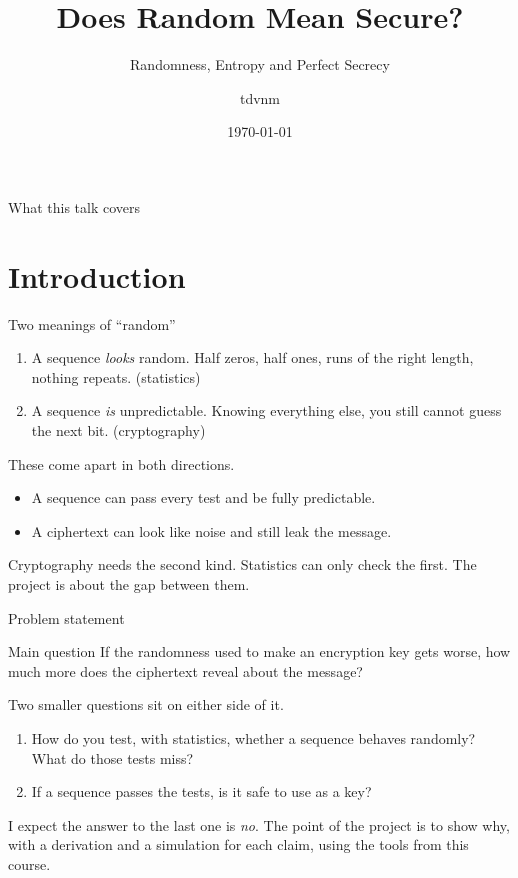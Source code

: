 \documentclass[10pt,aspectratio=169]{beamer}
\title{Does Random Mean Secure?}
\subtitle{Randomness, Entropy and Perfect Secrecy}
\author{tdvnm}
\institute{Probability and Statistics --- project proposal}
\date{\today}
\begin{document}
\begin{frame}[plain]
  \titlepage
\end{frame}

\begin{frame}{What this talk covers}
  \tableofcontents
\end{frame}

\section[Intro]{Introduction}

\begin{frame}{Two meanings of ``random''}
  \begin{enumerate}
    \item A sequence \emph{looks} random. Half zeros, half ones, runs of
          the right length, nothing repeats. \hfill (statistics)
    \item A sequence \emph{is} unpredictable. Knowing everything else,
          you still cannot guess the next bit. \hfill (cryptography)
  \end{enumerate}
  \pause
  \medskip
  These come apart in both directions.
  \begin{itemize}
    \item A sequence can pass every test and be fully predictable.
    \item A ciphertext can look like noise and still leak the message.
  \end{itemize}
  \pause
  \medskip
  Cryptography needs the second kind. Statistics can only check the
  first. The project is about the gap between them.
\end{frame}

\begin{frame}{Problem statement}
  \begin{block}{Main question}
    If the randomness used to make an encryption key gets worse, how
    much more does the ciphertext reveal about the message?
  \end{block}
  \medskip
  Two smaller questions sit on either side of it.
  \begin{enumerate}
    \item How do you test, with statistics, whether a sequence behaves
          randomly? What do those tests miss?
    \item If a sequence passes the tests, is it safe to use as a key?
  \end{enumerate}
  \pause
  \medskip
  I expect the answer to the last one is \emph{no}. The point of the
  project is to show why, with a derivation and a simulation for each
  claim, using the tools from this course.
\end{frame}
\end{document}
